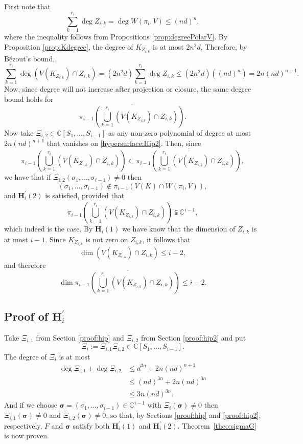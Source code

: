 \documentclass[a4paper]{article}
\def\C{\mathbb{C}}
\begin{document}
\smallskip
%
%
First note that 
%
\[
\sum_{k=1}^{r_i} \deg Z_{i,k} = \deg W(\pi_i,V) \leq (nd)^n,
\]
where the inequality follows from Propositions \ref{prop:degreePolarV}. By Proposition \ref{prop:Kdegree}, the degree of $K_{Z_{i,k}}$ is at most $2n^2d$, Therefore, by B\'ezout's bound,
%
\[
\sum_{k=1}^{r_i} \deg (V(K_{Z_{i,k}}) \cap Z_{i,k}) = (2n^2d)\sum_{k=1}^{r_i} \deg Z_{i,k} \leq (2n^2d)((nd)^n) = 2n(nd)^{n+1}.
\]
%
\noindent 
Now, since degree will not increase after projection or closure, the same degree bound holds for
\begin{equation}\label{hypersurface:Hip2} 
\overline{\pi_{i-1} \left(\bigcup_{k=1}^{r_i} \left(V(K_{Z_{i,k}}) \cap Z_{i,k}\right)\right)}.
\end{equation}
Now take $\Xi_{i,2} \in \C[S_1,\hdots,S_{i-1}]$ as any non-zero polynomial of degree at most $2n(nd)^{n+1}$ that vanishes on \ref{hypersurface:Hip2}. Then, since 
\[
\pi_{i-1} \left(\bigcup_{k=1}^{r_i} \left(V(K_{Z_{i,k}}) \cap Z_{i,k}\right)\right) \subset\overline{\pi_{i-1} \left(\bigcup_{k=1}^{r_i} \left(V(K_{Z_{i,k}}) \cap Z_{i,k}\right)\right)},
\]
we have that if $\Xi_{i,2}(\sigma_1,\hdots,\sigma_{i-1}) \not = 0$ then
\[
(\sigma_1,\hdots,\sigma_{i-1}) \not \in \pi_{i-1} (V(K) \cap W(\pi_i,V)),
\]
and $\bm H_i^{'}(2)$ is satisfied, provided that 
\[
\overline{\pi_{i-1} \left(\bigcup_{k=1}^{r_i} \left(V(K_{Z_{i,k}}) \cap Z_{i,k}\right)\right)} \subsetneqq \C^{i-1},
\]
which indeed is the case. By $\bm H_i(1)$ we have know that the dimension of $Z_{i,k}$ is at most $i-1.$ Since $K_{Z_{i,k}}$ is not zero on $Z_{i,k}$, it follows that 
\[
\dim \left(V(K_{Z_{i,k}}) \cap Z_{i,k}\right) \leq i-2, 
\]
and therefore 
\[
\dim \overline{\pi_{i-1} \left(\bigcup_{k=1}^{r_i} \left(V(K_{Z_{i,k}}) \cap Z_{i,k}\right)\right)} \leq i-2. 
\]
\subsection{Proof of $\textbf{H}_i^{'}$}\label{proof:hipf}
Take $\Xi_{i,1}$ from Section \ref{proof:hip} and $\Xi_{i,2}$ from Section \ref{proof:hip2} and put  
\[
\Xi_i := \Xi_{i,1} \Xi_{i,2} \in \C[S_1,\hdots,S_{i-1}].
\]
The degree of $\Xi_i$ is at most 
\begin{align*}
\deg \Xi_{i,1} + \deg \Xi_{i,2} & \leq d^{3n} + 2n(nd)^{n+1}\\
& \leq (nd)^{3n} + 2n(nd)^{3n}\\
& \leq 3n(nd)^{3n}.
\end{align*}
And if we choose $\bm \sigma = (\sigma_1,\hdots, \sigma_{i-1}) \in \C^{i-1}$ with 
$\Xi_i(\bm \sigma) \not = 0$ then $\Xi_{i,1}(\bm \sigma) \not = 0$ and $\Xi_{i,2}(\bm \sigma) \not = 0$, so that, by Sections \ref{proof:hip} and \ref{proof:hip2}, respectively, $F$ and $\bm \sigma$ satisfy both $\bm H_i^{'}(1)$ and $\bm H_i^{'}(2).$  
Theorem~\ref{theo:sigmaG} is now proven.
\end{document}
